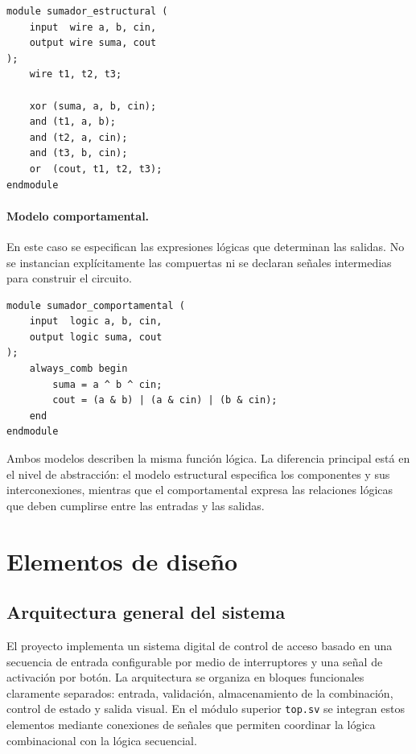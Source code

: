 \documentclass[12pt,letterpaper]{article}
\begin{document}
\begin{verbatim}
module sumador_estructural (
    input  wire a, b, cin,
    output wire suma, cout
);
    wire t1, t2, t3;

    xor (suma, a, b, cin);
    and (t1, a, b);
    and (t2, a, cin);
    and (t3, b, cin);
    or  (cout, t1, t2, t3);
endmodule
\end{verbatim}

\paragraph{Modelo comportamental.}

En este caso se especifican las expresiones lógicas que determinan
las salidas. No se instancian explícitamente las compuertas ni se
declaran señales intermedias para construir el circuito.

\begin{verbatim}
module sumador_comportamental (
    input  logic a, b, cin,
    output logic suma, cout
);
    always_comb begin
        suma = a ^ b ^ cin;
        cout = (a & b) | (a & cin) | (b & cin);
    end
endmodule
\end{verbatim}

Ambos modelos describen la misma función lógica. La diferencia
principal está en el nivel de abstracción: el modelo estructural
especifica los componentes y sus interconexiones, mientras que
el comportamental expresa las relaciones lógicas que deben
cumplirse entre las entradas y las salidas.

\section{Elementos de diseño}

\subsection{Arquitectura general del sistema}

El proyecto implementa un sistema digital de control de acceso basado en una secuencia de entrada configurable por medio de interruptores y una señal de activación por botón. La arquitectura se organiza en bloques funcionales claramente separados: entrada, validación, almacenamiento de la combinación, control de estado y salida visual. En el módulo superior \texttt{top.sv} se integran estos elementos mediante conexiones de señales que permiten coordinar la lógica combinacional con la lógica secuencial.
\end{document}
